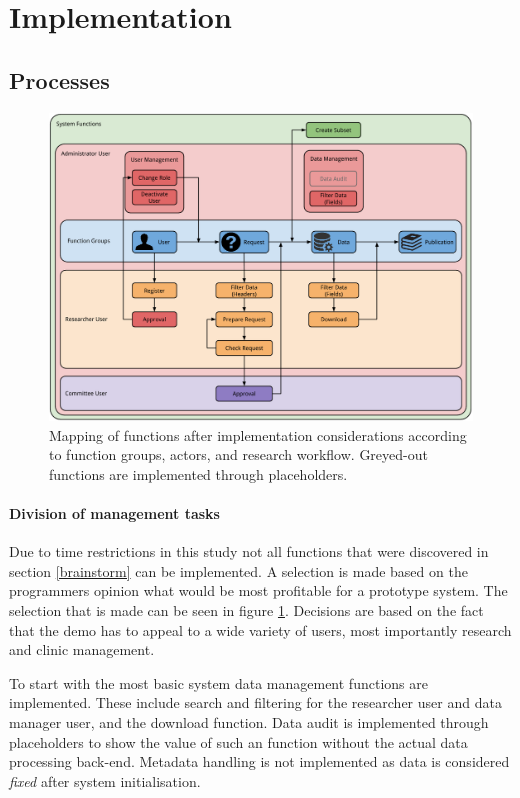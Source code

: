 \section{Implementation}

\subsection{Processes}

\begin{figure}[!b]
	\centering
	\includegraphics[width=1.0\linewidth]{images/functions-implemented}
	\caption{
		Mapping of functions after implementation considerations according to function groups, actors, and research workflow.
		Greyed-out functions are implemented through placeholders.
	}
	\label{fig:functions-implemented}
\end{figure}

\paragraph{Division of management tasks}
Due to time restrictions in this study not all functions that were discovered in section \ref{brainstorm} can be implemented.
A selection is made based on the programmers opinion what would be most profitable for a prototype system.
The selection that is made can be seen in figure \ref{fig:functions-implemented}.
Decisions are based on the fact that the demo has to appeal to a wide variety of users, most importantly research and clinic management.

To start with the most basic system data management functions are implemented.
These include search and filtering for the researcher user and data manager user, and the download function.
Data audit is implemented through placeholders to show the value of such an function without the actual data processing back-end.
Metadata handling is not implemented as data is considered \emph{fixed} after system initialisation.


